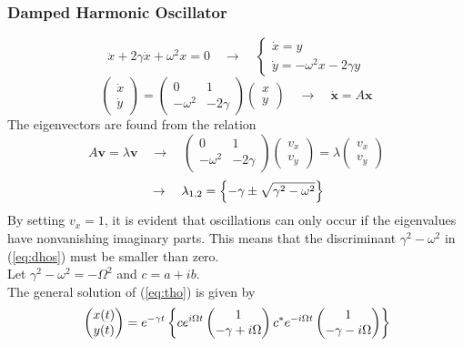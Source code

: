 \subsubsection{Damped Harmonic Oscillator}
\begin{equation}
	\ddot{x}+2\gamma\dot{x}+\omega^2x=0\quad\rightarrow\quad
	\begin{cases}
		\dot{x}=y\\
		\dot{y}=-\omega^2x-2\gamma y
	\end{cases}
\end{equation}
\begin{equation}
	\begin{pmatrix}
		\dot{x}\\\dot{y}
	\end{pmatrix}=
	\begin{pmatrix}
		0&1\\-\omega^2&-2\gamma
	\end{pmatrix}
	\begin{pmatrix}
		x\\y
	\end{pmatrix}
	\quad\rightarrow\quad
	\mathbf{\dot{x}}=A\mathbf{x}
\end{equation}
The eigenvectors are found from the relation
\begin{equation}
	A\mathbf{v}=\lambda\mathbf{v}\quad\rightarrow\quad
	\begin{pmatrix}
		0&1\\-\omega^2&-2\gamma
	\end{pmatrix}
	\begin{pmatrix}
		v_x\\v_y
	\end{pmatrix}=\lambda
	\begin{pmatrix}
		v_x\\v_y
	\end{pmatrix}
\end{equation}
\begin{equation}{\label{eq:dhos}}
	\rightarrow\quad\lambda_{1,2}=\left\{-\gamma\pm\sqrt{\gamma^2-\omega^2}\right\}
\end{equation}
By setting $v_x =1$, it is evident that oscillations can only occur if the eigenvalues have nonvanishing imaginary parts.
This means that the discriminant $\gamma^2-\omega^2$ in (\ref{eq:dhos}) must be smaller than zero.\\
Let $\gamma^2-\omega^2=-\Omega^2$ and $c=a+ib$.\\ 
The general solution  of (\ref{eq:tho}) is given by
\begin{equation}{\label{eq:gsho}}
	\begin{pmatrix}
		x(t)\\y(t)
	\end{pmatrix}=
	e^{-\gamma t}\left\{ce^{i\Omega t}
	\begin{pmatrix}
		1\\-\gamma+i\Omega
	\end{pmatrix}
	c^\ast e^{-i\Omega t}
	\begin{pmatrix}
		1\\-\gamma-i\Omega
	\end{pmatrix}\right\}
\end{equation}
